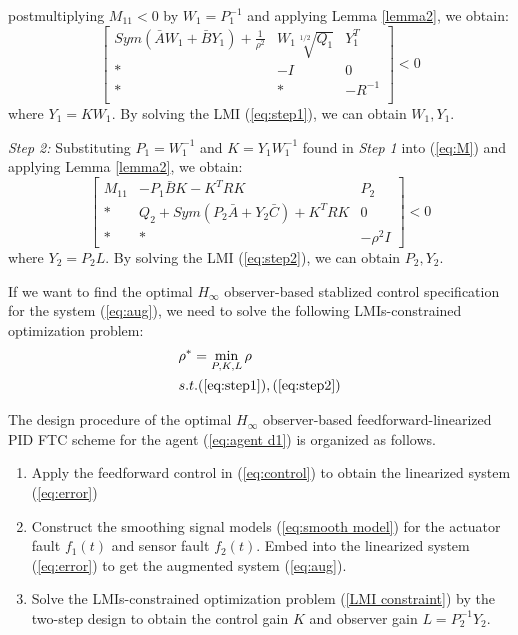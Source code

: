 \documentclass{ieeeaccess}
\begin{document}
postmultiplying $M_{11}<0$ by $W_1=P_1^{-1}$ and applying Lemma \ref{lemma2}, we obtain:
\begin{equation} \label{eq:step1}
    \begin{bmatrix}
        Sym(\bar{A}W_1+\bar{B}Y_1) + \frac{1}{\rho^2} & W_1\sqrt[1/2]{Q_1} & Y_1^T \\
        * & -I & 0\\
        * & * & -R^{-1}\\
    \end{bmatrix} < 0
\end{equation}
where $Y_1=KW_1$. By solving the LMI (\ref{eq:step1}), we can obtain $W_1,Y_1$.

\textit{Step 2:} Substituting $P_1=W_1^{-1}$ and $K=Y_1W_1^{-1}$ found in \textit{Step 1} into (\ref{eq:M}) and applying Lemma \ref{lemma2}, we obtain:
\begin{equation} \label{eq:step2}
    \begin{bmatrix}
        M_{11} & -P_1\bar{B}K - K^TRK & P_2 \\
        * & Q_2+Sym(P_2\bar{A}+Y_2\bar{C}) + K^TRK & 0 \\
        * & * & -\rho^2I
    \end{bmatrix} < 0
\end{equation}
where $Y_2=P_2L$. By solving the LMI (\ref{eq:step2}), we can obtain $P_2,Y_2$.


If we want to find the optimal $H_\infty$ observer-based stablized control specification for the system (\ref{eq:aug}), we need to solve the following LMIs-constrained optimization problem:
\begin{equation} \label{LMI constraint}
    \begin{split}
        & \rho^*=\mathop{\min}_{P,K,L} \rho \\
        & s.t. (\refeq{eq:step1}),(\refeq{eq:step2}) 
    \end{split}
\end{equation}

The design procedure of the optimal $H_\infty$ observer-based feedforward-linearized PID FTC scheme for the agent (\ref{eq:agent d1}) is organized as follows.
\begin{enumerate}
    \item Apply the feedforward control in (\ref{eq:control}) to obtain the linearized system (\ref{eq:error})
    \item Construct the smoothing signal models (\ref{eq:smooth model}) for the actuator fault $f_1(t)$ and sensor fault $f_2(t)$. Embed into the linearized system (\ref{eq:error}) to get the augmented system (\ref{eq:aug}).
    \item Solve the LMIs-constrained optimization problem (\ref{LMI constraint}) by the two-step design to obtain the control gain $K$ and observer gain $L=P_2^{-1}Y_2$.
\end{enumerate}
\end{document}
